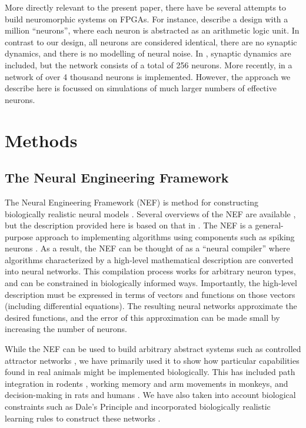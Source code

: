 \documentclass[english]{article}
\begin{document}
More directly relevant to the present paper, there have be several attempts to build neuromorphic systems on FPGAs.  For instance, \cite{cassidy2011design} describe a design with a million ``neurons'', where each neuron is abstracted as an arithmetic logic unit.  In contrast to our design, all neurons are considered identical, there are no synaptic dynamics, and there is no modelling of neural noise. In \cite{li2012a}, synaptic dynamics are included, but the network consists of a total of 256 neurons.  More recently, in \cite{wang2013} a network of over 4 thousand neurons is implemented.  However, the approach we describe here is focussed on simulations of much larger numbers of effective neurons.

\section{Methods}

\subsection{\label{sub:NEF}The Neural Engineering Framework}

The Neural Engineering Framework (NEF) is method for constructing biologically realistic neural models \cite{Eliasmith1999s}.  Several overviews of the NEF are available \cite{Eliasmith2003f,Eliasmith2005p,stewart2012b,Eliasmith2012b}, but the description provided here is based on that in \cite{Stewart2014}.   
The NEF is a general-purpose approach to
implementing algorithms using components such
as spiking neurons \cite{Eliasmith2003m}. As a result, the NEF can be thought of
as a ``neural compiler'' where algorithms characterized by a high-level
mathematical description are converted into neural networks.
This compilation process works for arbitrary neuron types, and can
be constrained in biologically informed ways. Importantly, the high-level
description must be expressed in terms of vectors and functions on
those vectors (including differential equations). The resulting
neural networks approximate the desired functions, and the error of
this approximation can be made small by increasing the
number of neurons.

While the NEF can be used to build arbitrary abstract systems such
as controlled attractor networks \cite{Eliasmith2005p}, we have primarily
used it to show how particular capabilities found in real animals
might be implemented biologically. This has included path integration
in rodents \cite{Conklin2005b}, working memory \cite{Singh2006b}
and arm movements \cite{Dewolf} in monkeys, and decision-making in
rats \cite{Laubach2010,Liu2011} and humans \cite{Litt2008u}. We
have also taken into account biological constraints such as Dale's
Principle \cite{Parisien2008c} and incorporated biologically realistic
learning rules to construct these networks \cite{MacNeil2011a,bekolay2013}.
\end{document}
